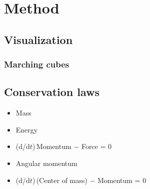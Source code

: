 \part{Method}






\chapter{Visualization}

\section{Marching cubes}

\chapter{Conservation laws}

\begin{itemize}
    \item Mass
    \item Energy
    \item (d/d$t$)\,Momentum $-$ Force = 0
    \item Angular momentum
    \item (d/d$t$)\,(Center of mass) $-$ Momentum = 0
\end{itemize}